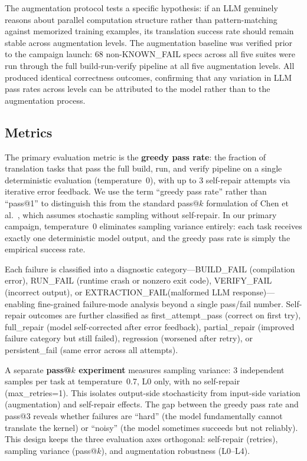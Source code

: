 \documentclass[conference]{IEEEtran}
\newcommand{\buildfail}{\textsc{BUILD\_FAIL}}
\newcommand{\runfail}{\textsc{RUN\_FAIL}}
\newcommand{\verifyfail}{\textsc{VERIFY\_FAIL}}
\newcommand{\extractionfail}{\textsc{EXTRACTION\_FAIL}}
\begin{document}
The augmentation protocol tests a specific hypothesis: if an LLM genuinely reasons about parallel computation structure rather than pattern-matching against memorized training examples, its translation success rate should remain stable across augmentation levels. The augmentation baseline was verified prior to the campaign launch: 68 non-KNOWN\_FAIL specs across all five suites were run through the full build-run-verify pipeline at all five augmentation levels. All produced identical correctness outcomes, confirming that any variation in LLM pass rates across levels can be attributed to the model rather than to the augmentation process.

\subsection{Metrics}
\label{sec:metrics}

The primary evaluation metric is the \textbf{greedy pass rate}: the fraction of translation tasks that pass the full build, run, and verify pipeline on a single deterministic evaluation (temperature~0), with up to 3 self-repair attempts via iterative error feedback. We use the term ``greedy pass rate'' rather than ``pass@1'' to distinguish this from the standard pass@$k$ formulation of Chen et al.~\cite{HumanEval2021}, which assumes stochastic sampling without self-repair. In our primary campaign, temperature~0 eliminates sampling variance entirely: each task receives exactly one deterministic model output, and the greedy pass rate is simply the empirical success rate.

Each failure is classified into a diagnostic category---\buildfail{} (compilation error), \runfail{} (runtime crash or nonzero exit code), \verifyfail{} (incorrect output), or \extractionfail (malformed LLM response)---enabling fine-grained failure-mode analysis beyond a single pass/fail number. Self-repair outcomes are further classified as first\_attempt\_pass (correct on first try), full\_repair (model self-corrected after error feedback), partial\_repair (improved failure category but still failed), regression (worsened after retry), or persistent\_fail (same error across all attempts).

A separate \textbf{pass@$k$ experiment} measures sampling variance: 3 independent samples per task at temperature~0.7, L0 only, with no self-repair (max\_retries=1). This isolates output-side stochasticity from input-side variation (augmentation) and self-repair effects. The gap between the greedy pass rate and pass@3 reveals whether failures are ``hard'' (the model fundamentally cannot translate the kernel) or ``noisy'' (the model sometimes succeeds but not reliably). This design keeps the three evaluation axes orthogonal: self-repair (retries), sampling variance (pass@$k$), and augmentation robustness (L0--L4).
\end{document}
